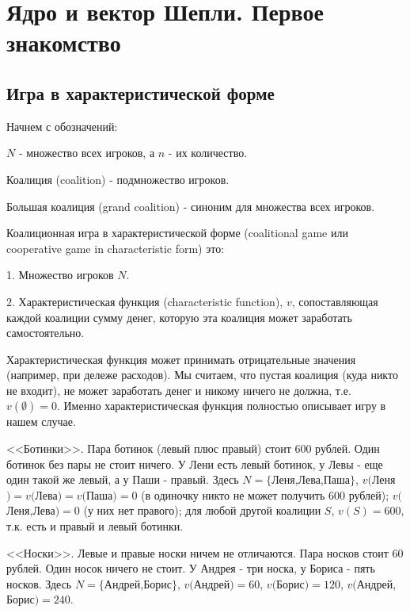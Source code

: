 \section{Ядро и вектор Шепли. Первое знакомство}

\subsection{Игра в характеристической форме}

Начнем с обозначений:

$N$ - множество всех игроков, а $n$ - их количество.

\begin{mydef}
Коалиция  (coalition) - подмножество игроков.
\end{mydef}

\begin{mydef}
Большая коалиция  (grand coalition) - синоним для множества всех игроков.
\end{mydef}


\begin{mydef}
Коалиционная игра в характеристической форме  (coalitional game или cooperative game in characteristic form) это:

1. Множество игроков $N$.

2. Характеристическая функция (characteristic function), $v$, сопоставляющая каждой коалиции сумму денег, которую эта коалиция может заработать самостоятельно.
\end{mydef}

Характеристическая функция может принимать отрицательные значения (например, при дележе расходов). Мы считаем, что пустая коалиция (куда никто не входит), не может заработать денег и никому ничего не должна, т.е. $v(\emptyset)=0$. Именно характеристическая функция полностью описывает игру в нашем случае.

\begin{myex} <<Ботинки>>. Пара ботинок (левый плюс правый) стоит 600 рублей. Один ботинок без пары не стоит ничего. У Лени есть левый ботинок, у Левы - еще один такой же левый, а у Паши - правый. Здесь $N=\{$Леня,Лева,Паша$\}$, $v($Леня$)=v($Лева$)=v($Паша$)=0$ (в одиночку никто не может получить 600 рублей); $v($Леня,Лева$)=0$ (у них нет правого); для любой другой коалиции $S$, $v(S)=600$, т.к. есть и правый и левый ботинки. 
\end{myex}

\begin{myex} <<Носки>>. Левые и правые носки ничем не отличаются. Пара носков стоит 60 рублей. Один носок ничего не стоит. У Андрея - три носка, у Бориса - пять носков. Здесь $N=\{$Андрей,Борис$\}$, $v($Андрей$)=60$, $v($Борис$)=120$, $v($Андрей, Борис$)=240$.
\end{myex}


